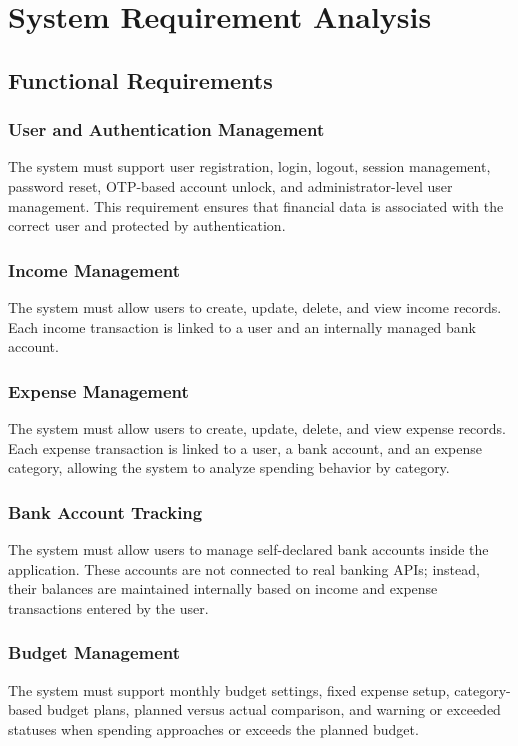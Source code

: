 \documentclass{article}
\begin{document}
\section{System Requirement Analysis}
\subsection{Functional Requirements}

\subsubsection{User and Authentication Management}
The system must support user registration, login, logout, session management, password reset, OTP-based account unlock, and administrator-level user management. This requirement ensures that financial data is associated with the correct user and protected by authentication.

\subsubsection{Income Management}
The system must allow users to create, update, delete, and view income records. Each income transaction is linked to a user and an internally managed bank account.

\subsubsection{Expense Management}
The system must allow users to create, update, delete, and view expense records. Each expense transaction is linked to a user, a bank account, and an expense category, allowing the system to analyze spending behavior by category.

\subsubsection{Bank Account Tracking}
The system must allow users to manage self-declared bank accounts inside the application. These accounts are not connected to real banking APIs; instead, their balances are maintained internally based on income and expense transactions entered by the user.

\subsubsection{Budget Management}
The system must support monthly budget settings, fixed expense setup, category-based budget plans, planned versus actual comparison, and warning or exceeded statuses when spending approaches or exceeds the planned budget.
\end{document}
